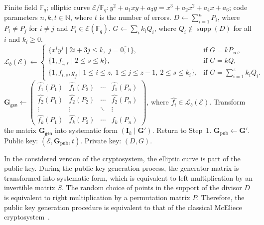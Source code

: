 \documentclass[sn-mathphys-num]{sn-jnl_modified}
\newcommand{\FF}{\ensuremath{\mathbb{F}}}
\begin{document}
\begin{algorithm}[H]
\caption{Key generation for the McEliece cryptosystem based on elliptic codes}
\label{alg:McEliece_keygen}
\begin{algorithmic}[1]
\Require Finite field $\mathbb{F}_q$; elliptic curve $\mathcal{E}/\FF_q: y^2 + a_1xy + a_3y = x^3 + a_2x^2 + a_4x + a_6$; code parameters $n,k,t \in \mathbb{N}$, where $t$ is the number of errors.
\State $D \gets \sum_{i=1}^n P_i$, where $P_i \neq P_j$ for $i\neq j$ and $P_i \in \mathcal{E}(\FF_q)$.
\State $G \gets \sum_i k_iQ_i$, where $Q_i \not\in \operatorname{supp}(D)$ for all $i$ and $k_i \geq 0$. 
\State $\mathscr{L}_b(\mathcal{E}) \gets
\begin{cases}
\{ x^iy^j \mid 2i+3j \leq k,\; j = \overline{0,1} \}, & \text{if } G = kP_\infty,\\
\{1, f_{1,s} \mid 2 \leq s \leq k\}, & \text{if } G = kQ,\\
\{1, f_{i,s}, g_j \mid 1 \leq i \leq z,\ 1 \leq j \leq z-1,\ 2 \leq s \leq k_i\}, & \text{if } G = \sum_{i=1}^z k_iQ_i.
\end{cases}$
\State $\mathbf{G}_{\mathsf{gen}} \gets
\begin{pmatrix}
\widehat{f_1}(P_1) & \widehat{f_1}(P_2) & \cdots & \widehat{f_1}(P_n) \\
\widehat{f_2}(P_1) & \widehat{f_2}(P_2) & \cdots & \widehat{f_2}(P_n) \\
\vdots & \vdots & \ddots & \vdots \\
\widehat{f_k}(P_1) & \widehat{f_k}(P_2) & \cdots & \widehat{f_k}(P_n)
\end{pmatrix}$, where $\widehat{f_i} \in \mathscr{L}_b(\mathcal{E})$.
\State Transform the matrix $\mathbf{G}_{\mathsf{gen}}$ into systematic form $\left(\mathbf{I}_k \mid \mathbf{G}'\right)$.
\State Return to Step~1. 
\EndIf
\State $\mathbf{G}_{\operatorname{pub}} \gets \mathbf{G}'$.
\Ensure Public key: $(\mathcal{E}, \mathbf{G}_{\operatorname{pub}}, t)$. Private key: $(D, G)$.
\end{algorithmic}
\end{algorithm}


In the considered version of the cryptosystem, the elliptic curve is part of the public key. During the public key generation process, the generator matrix is transformed into systematic form, which is equivalent to left multiplication by an invertible matrix $S$. The random choice of points in the support of the divisor $D$ is equivalent to right multiplication by a permutation matrix $P$. Therefore, the public key generation procedure is equivalent to that of the classical McEliece cryptosystem~\cite{McEliece78}.
\end{document}
